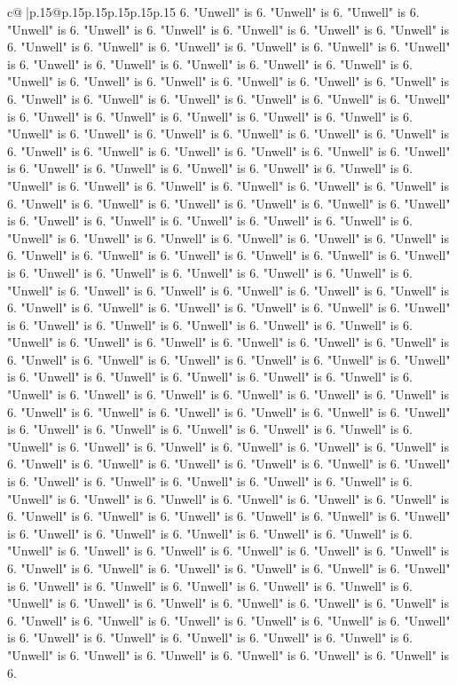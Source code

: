 \documentclass{article}
\begin{document}
{\begin{supertabular}{c@{$\;$}|p{.15\linewidth}@{}p{.15\linewidth}p{.15\linewidth}p{.15\linewidth}p{.15\linewidth}p{.15\linewidth}}
{{{6. "Unwell" is 6. "Unwell" is 6. "Unwell" is 6. "Unwell" is 6. "Unwell" is 6. "Unwell" is 6. "Unwell" is 6. "Unwell" is 6. "Unwell" is 6. "Unwell" is 6. "Unwell" is 6. "Unwell" is 6. "Unwell" is 6. "Unwell" is 6. "Unwell" is 6. "Unwell" is 6. "Unwell" is 6. "Unwell" is 6. "Unwell" is 6. "Unwell" is 6. "Unwell" is 6. "Unwell" is 6. "Unwell" is 6. "Unwell" is 6. "Unwell" is 6. "Unwell" is 6. "Unwell" is 6. "Unwell" is 6. "Unwell" is 6. "Unwell" is 6. "Unwell" is 6. "Unwell" is 6. "Unwell" is 6. "Unwell" is 6. "Unwell" is 6. "Unwell" is 6. "Unwell" is 6. "Unwell" is 6. "Unwell" is 6. "Unwell" is 6. "Unwell" is 6. "Unwell" is 6. "Unwell" is 6. "Unwell" is 6. "Unwell" is 6. "Unwell" is 6. "Unwell" is 6. "Unwell" is 6. "Unwell" is 6. "Unwell" is 6. "Unwell" is 6. "Unwell" is 6. "Unwell" is 6. "Unwell" is 6. "Unwell" is 6. "Unwell" is 6. "Unwell" is 6. "Unwell" is 6. "Unwell" is 6. "Unwell" is 6. "Unwell" is 6. "Unwell" is 6. "Unwell" is 6. "Unwell" is 6. "Unwell" is 6. "Unwell" is 6. "Unwell" is 6. "Unwell" is 6. "Unwell" is 6. "Unwell" is 6. "Unwell" is 6. "Unwell" is 6. "Unwell" is 6. "Unwell" is 6. "Unwell" is 6. "Unwell" is 6. "Unwell" is 6. "Unwell" is 6. "Unwell" is 6. "Unwell" is 6. "Unwell" is 6. "Unwell" is 6. "Unwell" is 6. "Unwell" is 6. "Unwell" is 6. "Unwell" is 6. "Unwell" is 6. "Unwell" is 6. "Unwell" is 6. "Unwell" is 6. "Unwell" is 6. "Unwell" is 6. "Unwell" is 6. "Unwell" is 6. "Unwell" is 6. "Unwell" is 6. "Unwell" is 6. "Unwell" is 6. "Unwell" is 6. "Unwell" is 6. "Unwell" is 6. "Unwell" is 6. "Unwell" is 6. "Unwell" is 6. "Unwell" is 6. "Unwell" is 6. "Unwell" is 6. "Unwell" is 6. "Unwell" is 6. "Unwell" is 6. "Unwell" is 6. "Unwell" is 6. "Unwell" is 6. "Unwell" is 6. "Unwell" is 6. "Unwell" is 6. "Unwell" is 6. "Unwell" is 6. "Unwell" is 6. "Unwell" is 6. "Unwell" is 6. "Unwell" is 6. "Unwell" is 6. "Unwell" is 6. "Unwell" is 6. "Unwell" is 6. "Unwell" is 6. "Unwell" is 6. "Unwell" is 6. "Unwell" is 6. "Unwell" is 6. "Unwell" is 6. "Unwell" is 6. "Unwell" is 6. "Unwell" is 6. "Unwell" is 6. "Unwell" is 6. "Unwell" is 6. "Unwell" is 6. "Unwell" is 6. "Unwell" is 6. "Unwell" is 6. "Unwell" is 6. "Unwell" is 6. "Unwell" is 6. "Unwell" is 6. "Unwell" is 6. "Unwell" is 6. "Unwell" is 6. "Unwell" is 6. "Unwell" is 6. "Unwell" is 6. "Unwell" is 6. "Unwell" is 6. "Unwell" is 6. "Unwell" is 6. "Unwell" is 6. "Unwell" is 6. "Unwell" is 6. "Unwell" is 6. "Unwell" is 6. "Unwell" is 6. "Unwell" is 6. "Unwell" is 6. "Unwell" is 6. "Unwell" is 6. "Unwell" is 6. "Unwell" is 6. "Unwell" is 6. "Unwell" is 6. "Unwell" is 6. "Unwell" is 6. "Unwell" is 6. "Unwell" is 6. "Unwell" is 6. "Unwell" is 6. "Unwell" is 6. "Unwell" is 6. "Unwell" is 6. "Unwell" is 6. "Unwell" is 6. "Unwell" is 6. "Unwell" is 6. "Unwell" is 6. "Unwell" is 6. "Unwell" is 6. "Unwell" is 6. "Unwell" is 6. "Unwell" is 6. "Unwell" is 6. "Unwell" is 6. "Unwell" is 6. "Unwell" is 6. "Unwell" is 6. "Unwell" is 6. "Unwell" is 6. "Unwell" is 6. "Unwell" is 6. "Unwell" is 6. "Unwell" is 6. "Unwell" is 6. "Unwell" is 6. "Unwell" is 6. "Unwell" is 6. "Unwell" is 6. "Unwell" is 6. "Unwell" is 6. "Unwell" is 6. "Unwell" is 6. "Unwell" is 6. "Unwell" is 6. "Unwell" is 6. "Unwell" is 6. }}}
\end{supertabular}}
\end{document}
